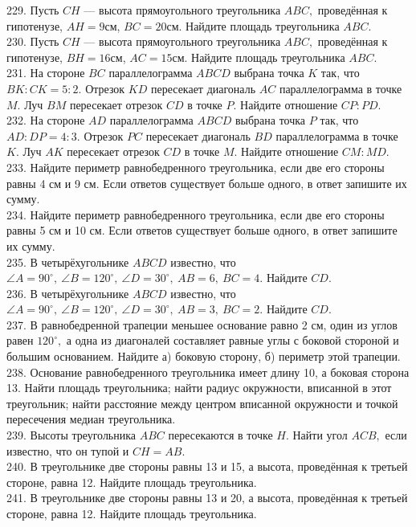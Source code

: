 229. Пусть $CH$ --- высота прямоугольного треугольника $ABC,$ проведённая к гипотенузе, $AH=9$см, $BC=20$см. Найдите площадь треугольника $ABC.$\\
230. Пусть $CH$ --- высота прямоугольного треугольника $ABC,$ проведённая к гипотенузе, $BH=16$см, $AC=15$см. Найдите площадь треугольника $ABC.$\\
231. На стороне $BC$ параллелограмма $ABCD$ выбрана точка $K$ так, что $BK:CK=5:2.$ Отрезок $KD$ пересекает диагональ $AC$ параллелограмма в точке $M.$ Луч $BM$ пересекает отрезок $CD$ в точке $P.$ Найдите отношение $CP:PD.$\\
232. На стороне $AD$ параллелограмма $ABCD$ выбрана точка $P$ так, что $AD:DP=4:3.$ Отрезок $PC$ пересекает диагональ $BD$ параллелограмма в точке $K.$ Луч $AK$ пересекает отрезок $CD$ в точке $M.$ Найдите отношение $CM:MD.$\\
233. Найдите периметр равнобедренного треугольника, если две его стороны равны 4 см и 9 см. Если ответов существует больше одного, в ответ запишите их сумму.\\
234. Найдите периметр равнобедренного треугольника, если две его стороны равны 5 см и 10 см. Если ответов существует больше одного, в ответ запишите их сумму.\\
235. В четырёхугольнике $ABCD$ известно, что $\angle A=90^\circ,\ \angle B=120^\circ,\ \angle D=30^\circ,\ AB=6,\ BC=4.$ Найдите $CD.$\\
236. В четырёхугольнике $ABCD$ известно, что $\angle A=90^\circ,\ \angle B=120^\circ,\ \angle D=30^\circ,\ AB=3,\ BC=2.$ Найдите $CD.$\\
237. В равнобедренной трапеции меньшее основание равно 2 см, один из углов равен $120^\circ,$ а одна из диагоналей составляет равные углы с боковой стороной и большим основанием. Найдите а) боковую сторону, б) периметр этой трапеции.\\
238. Основание равнобедренного треугольника имеет длину 10, а боковая сторона 13. Найти площадь треугольника; найти радиус окружности, вписанной в этот треугольник; найти расстояние между центром вписанной окружности и точкой пересечения медиан треугольника.\\
239. Высоты треугольника $ABC$ пересекаются в точке $H.$ Найти угол $ACB,$ если известно, что он тупой и $CH=AB.$\\
240. В треугольнике две стороны равны 13 и 15, а высота, проведённая к третьей стороне, равна 12. Найдите площадь треугольника.\\
241. В треугольнике две стороны равны 13 и 20, а высота, проведённая к третьей стороне, равна 12. Найдите площадь треугольника.\\
